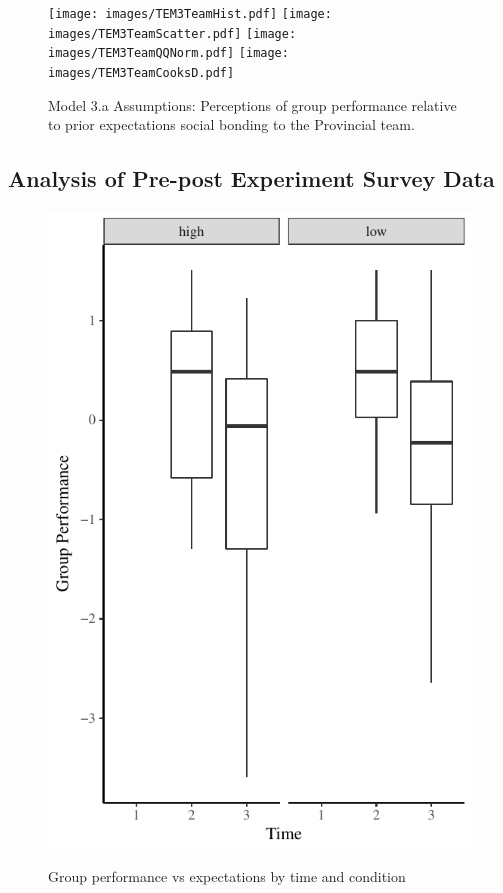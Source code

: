 \begin{figure}[htbp]
    \texttt{[image: images/TEM3TeamHist.pdf]}
    \texttt{[image: images/TEM3TeamScatter.pdf]}
    \texttt{[image: images/TEM3TeamQQNorm.pdf]}
    \texttt{[image: images/TEM3TeamCooksD.pdf]}
    \caption{Model 3.a Assumptions: Perceptions of group performance relative to prior expectations social bonding to the Provincial team.}
    \label{fig:M3TeamAssumptions}
\end{figure}




\subsection{Analysis of Pre-post Experiment Survey Data}







\begin{figure}
  \centering
    \includegraphics[width=0.5\linewidth,keepaspectratio] {images/groupPerfConfPlot}
    \label{fig:groupPerfConfPlot}
    \caption{Group performance vs expectations by time and condition}
\end{figure}


